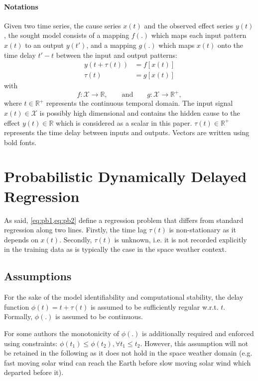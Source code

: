 \paragraph{Notations}
Given two time series, the cause series $x(t)$ and the observed effect series $y(t)$, the sought 
model consists of a mapping $f(.)$ which maps each input pattern $x(t)$ to an output $y(t')$, and a 
mapping $g(.)$ which maps $x(t)$ onto the time delay $t'-t$ between the input and output patterns:
%
\begin{align}
y(t + \tau(t)) & = f[x(t)]\label{eq:pb1}\\
\tau(t) & = g[x(t)]\label{eq:pb2} 
\end{align}
with
\[
f: \mathcal{X}  \rightarrow \mathbb{R},\qquad\text{and}\qquad
g: \mathcal{X}  \rightarrow \mathbb{R}^{+},
\]
where $t \in \mathbb{R}^{+}$ represents the continuous temporal domain. The input signal 
$x(t)\in \mathcal{X}$ is possibly high dimensional and contains the hidden cause to 
the effect $y(t)\in\mathbb{R}$ which is considered as a scalar in this paper. 
$\tau(t)\in \mathbb{R}^+$ represents the time delay between inputs and outputs.
Vectors are written using bold fonts.

\section{Probabilistic Dynamically Delayed Regression}\label{sec:dtlrformulation}
As said, \cref{eq:pb1,eq:pb2} define a regression problem that differs from standard regression 
along two lines. Firstly, the time lag $\tau(t)$ is non-stationary as it depends on $x(t)$. 
Secondly, $\tau(t)$ is unknown, i.e. it is not recorded explicitly in the training data as is 
typically the case in the space weather context. 

\subsection{Assumptions}

For the sake of the model identifiability and computational stability, the delay function 
$\phi(t) = t + \tau(t)$ is assumed to be sufficiently regular w.r.t. $t$. Formally, $\phi(.)$ 
is assumed to be continuous.

For some authors \citep{ZHOU2006195} the monotonicity of $\phi(.)$ is additionally required and 
enforced using constraints: $\phi(t_1) \leq \phi(t_2), \forall t_1 \leq t_2$. However, this 
assumption will not be retained in the following as it does not hold in the space weather domain 
(e.g. fast moving solar wind can reach the Earth before slow moving solar wind which departed 
before it). 

